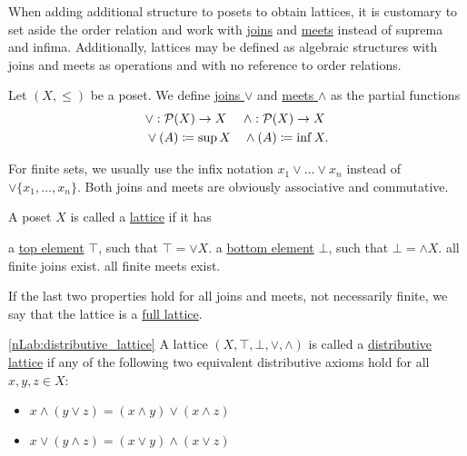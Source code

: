 When adding additional structure to posets to obtain lattices, it is customary to set aside the order relation and work with \uline{joins} and \uline{meets} instead of suprema and infima. Additionally, lattices may be defined as algebraic structures with joins and meets as operations and with no reference to order relations.

\begin{definition}\label{def:join_meet}\cite[28]{Lectures:general_topology}
  Let $(X, \leq)$ be a poset. We define \uline{joins $\lor$} and \uline{meets $\land$} as the partial functions
  \begin{align*}
    &\lor: \operatorname{\mathcal P}(X) \to X
    &&\land: \operatorname{\mathcal P}(X) \to X
    \\
    &\lor(A) \coloneqq \sup X
    &&\land(A) \coloneqq \inf X.
  \end{align*}

  For finite sets, we usually use the infix notation $x_1 \lor \ldots \lor x_n$ instead of $\lor \{ x_1, \ldots, x_n \}$. Both joins and meets are obviously associative and commutative.
\end{definition}

\begin{definition}\label{def:lattice}\cite[28]{Lectures:general_topology}
  A poset $X$ is called a \uline{lattice} if it has
  \begin{description}
     a \uline{top element} $\top$, such that $\top = \lor X$.
     a \uline{bottom element} $\bot$, such that $\bot = \land X$.
     all finite joins exist.
     all finite meets exist.
  \end{description}

  If the last two properties hold for all joins and meets, not necessarily finite, we say that the lattice is a \uline{full lattice}.
\end{definition}

\begin{definition}\label{def:distributive_lattice}\cref{nLab:distributive_lattice}
  A lattice $(X, \top, \bot, \lor, \land)$ is called a \uline{distributive lattice} if any of the following two equivalent distributive axioms hold for all $x, y, z \in X$:
  \begin{itemize}
    \item $x \land (y \lor z) = (x \land y) \lor (x \land z)$
    \item $x \lor (y \land z) = (x \lor y) \land (x \lor z)$
  \end{itemize}
\end{definition}

